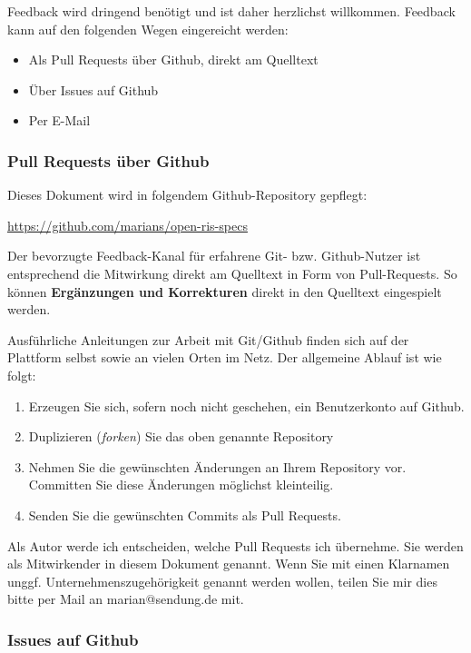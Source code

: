 \documentclass[,a4paper]{article}
\begin{document}
Feedback wird dringend benötigt und ist daher herzlichst willkommen.
Feedback kann auf den folgenden Wegen eingereicht werden:

\begin{itemize}
\item
  Als Pull Requests über Github, direkt am Quelltext
\item
  Über Issues auf Github
\item
  Per E-Mail
\end{itemize}

\subsubsection{Pull Requests über Github}

Dieses Dokument wird in folgendem Github-Repository gepflegt:

\href{https://github.com/marians/open-ris-specs}{https://github.com/marians/open-ris-specs}

Der bevorzugte Feedback-Kanal für erfahrene Git- bzw. Github-Nutzer ist
entsprechend die Mitwirkung direkt am Quelltext in Form von
Pull-Requests. So können \textbf{Ergänzungen und Korrekturen} direkt in
den Quelltext eingespielt werden.

Ausführliche Anleitungen zur Arbeit mit Git/Github finden sich auf der
Plattform selbst sowie an vielen Orten im Netz. Der allgemeine Ablauf
ist wie folgt:

\begin{enumerate}[1.]
\item
  Erzeugen Sie sich, sofern noch nicht geschehen, ein Benutzerkonto auf
  Github.
\item
  Duplizieren (\emph{forken}) Sie das oben genannte Repository
\item
  Nehmen Sie die gewünschten Änderungen an Ihrem Repository vor.
  Committen Sie diese Änderungen möglichst kleinteilig.
\item
  Senden Sie die gewünschten Commits als Pull Requests.
\end{enumerate}

Als Autor werde ich entscheiden, welche Pull Requests ich übernehme. Sie
werden als Mitwirkender in diesem Dokument genannt. Wenn Sie mit einen
Klarnamen unggf. Unternehmenszugehörigkeit genannt werden wollen, teilen
Sie mir dies bitte per Mail an marian@sendung.de mit.

\subsubsection{Issues auf Github}
\end{document}
